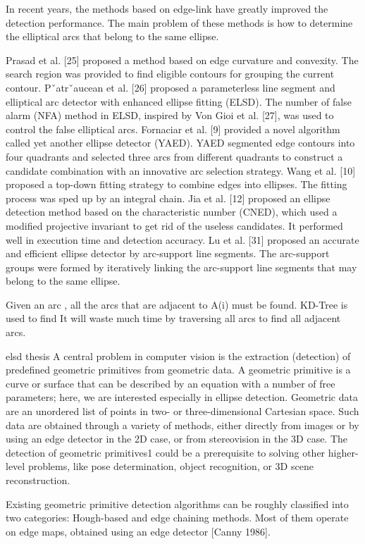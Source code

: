 \documentclass[a4paper]{report}
\begin{document}
In recent years, the methods based on edge-link have greatly
improved the detection performance. The main problem of
these methods is how to determine the elliptical arcs that
belong to the same ellipse.

Prasad et al. [25] proposed a method
based on edge curvature and convexity. The search region was
provided to find eligible contours for grouping the current
contour. Pˇatrˇaucean et al. [26] proposed a parameterless line
segment and elliptical arc detector with enhanced ellipse fitting
(ELSD). The number of false alarm (NFA) method in ELSD,
inspired by Von Gioi et al. [27], was used to control the false
elliptical arcs. Fornaciar et al. [9] provided a novel algorithm
called yet another ellipse detector (YAED). YAED segmented
edge contours into four quadrants and selected three arcs
from different quadrants to construct a candidate combination
with an innovative arc selection strategy. Wang et al. [10]
proposed a top-down fitting strategy to combine edges into
ellipses. The fitting process was sped up by an integral
chain. Jia et al. [12] proposed an ellipse
detection method based on the characteristic number (CNED),
which used a modified projective invariant to get rid of the
useless candidates. It performed well in execution time and
detection accuracy. Lu et al. [31] proposed an accurate and efficient ellipse detector
by arc-support line segments. The arc-support groups were
formed by iteratively linking the arc-support line segments that
may belong to the same ellipse. 

Given an arc , all the arcs that are adjacent to A(i) must be found. KD-Tree is used to find
It will waste much
time by traversing all arcs to find all adjacent arcs.

elsd thesis
A central problem in computer vision is the extraction (detection) of predefined geometric primitives
from geometric data. A geometric primitive is a curve or surface that can be described
by an equation with a number of free parameters; here, we are interested especially in ellipse
detection. Geometric data are an unordered list of points in two- or three-dimensional Cartesian
space. Such data are obtained through a variety of methods, either directly from images or by
using an edge detector in the 2D case, or from stereovision in the 3D case. The detection of
geometric primitives1 could be a prerequisite to solving other higher-level problems, like pose
determination, object recognition, or 3D scene reconstruction.

Existing geometric primitive detection algorithms can be roughly classified into two categories:
Hough-based and edge chaining methods. Most of them operate on edge maps, obtained
using an edge detector [Canny 1986].
\end{document}
